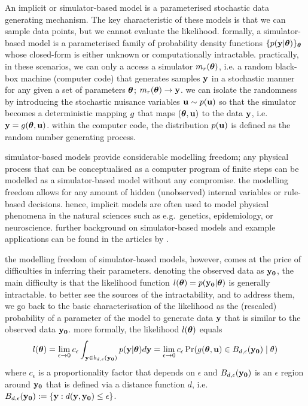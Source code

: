 An implicit or simulator-based model is a parameterised stochastic
data generating mechanism. The key characteristic of these models is
that we can sample data points, but we cannot evaluate the
likelihood. formally, a simulator-based model is a parameterised
family of probability density functions
\(\{ p(\mathbf{y}|\boldsymbol{\theta}) \}_{\boldsymbol{\theta}}\) whose closed-form is either unknown
or computationally intractable. practically, in these scenarios, we
can only a access a simulator \( m_r(\boldsymbol{\theta}) \), i.e. a random
black-box machine (computer code) that generates samples \(\mathbf{y}\) in a
stochastic manner for any given a set of parameters \(\boldsymbol{\theta}\);
\( m_r(\boldsymbol{\theta}) \rightarrow \mathbf{y} \). we can isolate the randomness by
introducing the stochastic nuisance variables \(\mathbf{u} \sim p(\mathbf{u})\) so
that the simulator becomes a deterministic mapping \(g\) that
maps \((\boldsymbol{\theta}, \mathbf{u})\) to the data \(\mathbf{y}\), i.e.\
\(\mathbf{y}=g(\boldsymbol{\theta},\mathbf{u})\). within the computer code, the
distribution \(p(\mathbf{u})\) is defined as the random number generating
process.

simulator-based models provide considerable modelling freedom; any
physical process that can be conceptualised as a computer program of
finite steps can be modelled as a simulator-based model without any
compromise. the modelling freedom allows for any amount of hidden
(unobserved) internal variables or rule-based decisions. hence,
implicit models are often used to model physical phenomena in the
natural sciences such as e.g.~genetics, epidemiology, or neuroscience. 
further background on simulator-based models and
example applications can be found in the articles
by \citet{gutmann2016, lintusaari2017, sisson2018, cranmer2020}.


the modelling freedom of simulator-based models, however, comes at the
price of difficulties in inferring their parameters. denoting the
observed data as \(\mathbf{y_0}\), the main difficulty is that the likelihood
function \(l(\boldsymbol{\theta}) = p(\mathbf{y_0}|\boldsymbol{\theta})\) is generally
intractable. to better see the sources of the intractability, and to
address them, we go back to the basic characterisation of the
likelihood as the (rescaled) probability of a parameter of the model
to generate data \(\mathbf{y}\) that is similar to the observed data
\(\mathbf{y_0}\). more formally, the likelihood \(l(\boldsymbol{\theta})\) equals
\begin{equation} \label{eq:likelihood}
  l(\boldsymbol{\theta}) = \lim_{\epsilon \to 0} c_\epsilon \int_{\mathbf{y} \in b_{d,\epsilon}(\mathbf{y_0})} p(\mathbf{y}|\boldsymbol{\theta})d\mathbf{y} =
  \lim_{\epsilon \to 0} c_\epsilon \Pr(g(\boldsymbol{\theta}, \mathbf{u}) \in B_{d,\epsilon}(\mathbf{y_0})  \mid \theta)
\end{equation}
where \(c_\epsilon\) is a proportionality factor that depends on
\(\epsilon\) and \(B_{d,\epsilon}(\mathbf{y_0})\) is an \(\epsilon\) region around \(\mathbf{y_0}\)
that is defined via a distance function \(d\), i.e.\ \(B_{d,\epsilon}(\mathbf{y_0})
:= \{\mathbf{y}: d(\mathbf{y}, \mathbf{y_0}) \leq \epsilon \}\). 

